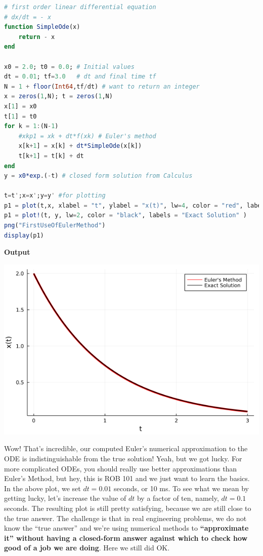 \begin{lstlisting}[language=Julia,style=mystyle]
# first order linear differential equation
# dx/dt = - x
function SimpleOde(x)
    return - x
end

x0 = 2.0; t0 = 0.0; # Initial values
dt = 0.01; tf=3.0   # dt and final time tf
N = 1 + floor(Int64,tf/dt) # want to return an integer
x = zeros(1,N); t = zeros(1,N)
x[1] = x0
t[1] = t0
for k = 1:(N-1)
    #xkp1 = xk + dt*f(xk) # Euler's method
    x[k+1] = x[k] + dt*SimpleOde(x[k])
    t[k+1] = t[k] + dt
end
y = x0*exp.(-t) # closed form solution from Calculus

t=t';x=x';y=y' #for plotting 
p1 = plot(t,x, xlabel = "t", ylabel = "x(t)", lw=4, color = "red", labels = "Euler's Method" )
p1 = plot!(t, y, lw=2, color = "black", labels = "Exact Solution" )
png("FirstUseOfEulerMethod")
display(p1)
\end{lstlisting}
\textbf{Output}
\begin{center}
\includegraphics[width=0.6\columnwidth]{graphics/Chap09/FirstUseOfEulerMethod.png}
\end{center}

Wow! That's incredible, our computed Euler's numerical approximation to the ODE is indistinguishable from the true solution! Yeah, but we got lucky. For more complicated ODEs, you should really use better approximations than Euler's Method, but hey, this is ROB 101 and we just want to learn the basics. \\


In the above plot, we set $dt = 0.01$ seconds, or 10 ms. To see what we mean by getting lucky, let's increase the value of $dt$ by a factor of ten, namely, $dt = 0.1$ seconds. The resulting plot is still pretty satisfying, because we are still close to the true answer. The challenge is that in real engineering problems, we do not know the ``true answer'' and we're using numerical methods to  \textbf{``approximate it'' without having a closed-form answer against which to check how good of a job we are doing}. Here we still did OK. \\

